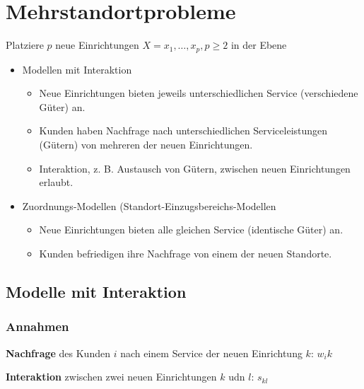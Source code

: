     

  

  \section{Mehrstandortprobleme} %
  \label{sec:mehrstandortprobleme}

    \par Platziere $p$ neue Einrichtungen $X={x_1, \dots, x_p}, p \geq 2$ in der Ebene

    \begin{itemize}
      \item Modellen mit Interaktion
        \begin{itemize}
          \item Neue Einrichtungen bieten jeweils unterschiedlichen Service (verschiedene Güter) an.
          \item Kunden haben Nachfrage nach unterschiedlichen Serviceleistungen (Gütern) von mehreren der neuen Einrichtungen.
          \item Interaktion, z. B. Austausch von Gütern, zwischen neuen Einrichtungen erlaubt.
        \end{itemize}
      \item Zuordnungs-Modellen (Standort-Einzugsbereichs-Modellen
        \begin{itemize}
          \item Neue Einrichtungen bieten alle gleichen Service (identische Güter) an.
          \item Kunden befriedigen ihre Nachfrage von einem der neuen Standorte.
        \end{itemize}
    \end{itemize}
  
    \subsection{Modelle mit Interaktion} %
    \label{sub:modelle_mit_interaktion}

      \subsubsection{Annahmen} %
      \label{ssub:annahmen}

        \par \textbf{Nachfrage} des Kunden $i$ nach einem Service der neuen Einrichtung $k$: $w_ik$
        \par \textbf{Interaktion} zwischen zwei neuen Einrichtungen $k$ udn $l$: $s_{kl}$     

